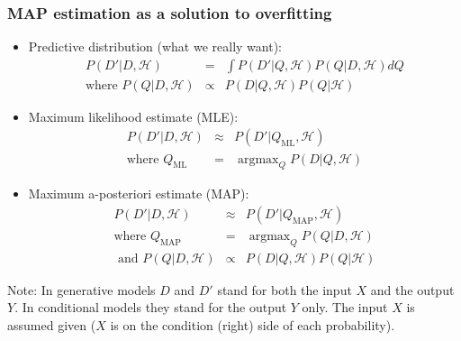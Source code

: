 \documentclass[ignorenonframetext,plain]{beamer}
\DeclareMathOperator*{\argmax}{argmax}
\begin{document}
\begin{frame}\frametitle{MAP estimation as a solution to overfitting}
\begin{itemize}
\item Predictive distribution (what we really want):\begin{eqnarray*}
  P(D'|D,\mathcal{H}) &=& \int P(D'|Q,\mathcal{H}) P(Q|D,\mathcal{H}) dQ \\
  \text{where } P(Q|D,\mathcal{H}) &\propto& P(D|Q,\mathcal{H}) P(Q|\mathcal{H})
\end{eqnarray*}
\item Maximum likelihood estimate (MLE):\begin{eqnarray*}
  P(D'|D,\mathcal{H}) &\approx& P(D'|Q_\text{ML}, \mathcal{H}) \\
\mbox{where } Q_\text{ML} &=& \argmax_Q P(D|Q,\mathcal{H})
\end{eqnarray*}
\item Maximum a-posteriori estimate (MAP):\begin{eqnarray*}
  P(D'|D,\mathcal{H}) &\approx& P(D'|Q_\text{MAP}, \mathcal{H}) \\
\mbox{where } Q_\text{MAP} &=& \argmax_Q P(Q|D,\mathcal{H}) \\
\mbox{ and } P(Q|D,\mathcal{H}) &\propto& P(D|Q,\mathcal{H}) P(Q|\mathcal{H})
\end{eqnarray*}
\end{itemize}
\footnotesize Note: In generative models $D$ and $D'$ stand for both
the input $X$ and the output $Y$.  In conditional models they stand
for the output $Y$ only.  The input $X$ is assumed given ($X$ is on
the condition (right) side of each probability).
\end{frame}
\end{document}

